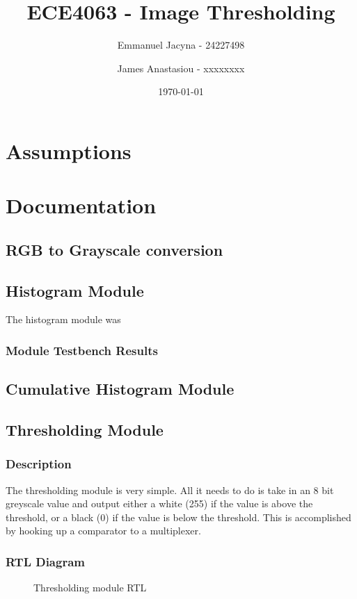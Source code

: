 \documentclass[12pt]{article}
\title{ECE4063 - Image Thresholding}
\author{Emmanuel Jacyna - 24227498 \and James Anastasiou - xxxxxxxx}
\date{\today}
\begin{document}
\pagestyle{myheadings}
  \maketitle
  \tableofcontents
  
  \section{Assumptions}
  
  \section{Documentation}
  \subsection{RGB to Grayscale conversion}
  
  \subsection{Histogram Module}
  The histogram module was 
  
  \subsubsection{Module Testbench Results}
  
  \subsection{Cumulative Histogram Module}
  
  \subsection{Thresholding Module}
  \subsubsection{Description}
  The thresholding module is very simple. All it needs to do is take in an 8 bit greyscale value and output either a white (255) if the value is above the threshold, or a black (0) if the value is below the threshold. This is accomplished by hooking up a comparator to a multiplexer.
  
  \subsubsection{RTL Diagram}
  \begin{figure}[H]
    \caption{Thresholding module RTL}
    \label{fig:thresholder_rtl}
  \end{figure}
  
\end{document}
